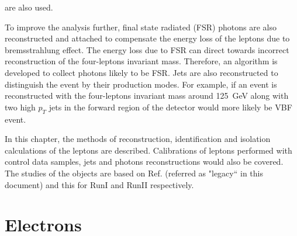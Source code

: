 are also used.
\par To improve the analysis further, final state  radiated (FSR) photons are also reconstructed and attached to compensate the energy loss of the leptons due 
to bremsstrahlung effect. The
energy loss due to FSR can direct towards incorrect reconstruction of the four-leptons invariant mass. Therefore, an algorithm is developed to collect
photons likely to be FSR. Jets are also reconstructed to distinguish the event by their production modes. For example, if an event is reconstructed
with the four-leptons invariant mass around 125~GeV along with two high $p_T$ jets in the forward region of the detector would more likely be VBF event.
\par In this chapter, the methods of reconstruction, identification and isolation calculations of the leptons are described. Calibrations of leptons 
performed with control data samples, jets and photons reconstructions would also be covered. The studies of the objects are based on 
Ref. \cite{cms:38eAN1} (referred as "legacy`` in this document) and  \cite{cms:38eAN2} this  for RunI and  RunII respectively.
\section{Electrons}\label{chapter3_sec1}
